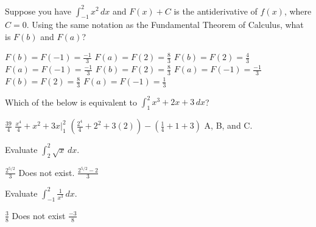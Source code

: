 \documentclass[addpoints, 12pt]{exam}%
\newcommand{\spc}{\vspace*{0.5cm}}
\begin{document}
\begin{questions}
\spc

\question[1]

Suppose you have $\int_{-1}^{2} x^2 \,dx$ and $F(x) + C$ is the antiderivative of $f(x)$, where $C = 0$.
Using the same notation as the Fundamental Theorem of Calculus, what is $F(b)$ and $F(a)$?

\begin{multicols}{2}
\begin{choices}
\choice $F(b) = F(-1) = \frac{-1}{3}$
\newline
$F(a) = F(2) = \frac{8}{3}$
\choice $F(b) = F(2) = \frac{4}{3}$
\newline 
$F(a) = F(-1) = \frac{-1}{3}$
\CorrectChoice $F(b) = F(2) = \frac{8}{3}$ 
\newline
$F(a) = F(-1) = \frac{-1}{3}$
\choice $F(b) = F(2) = \frac{8}{3}$
\newline
$F(a) = F(-1) = \frac{1}{3}$
\end{choices}
\end{multicols}

\spc

\question[1]

Which of the below is equivalent to $\int_{1}^{2} x^3 + 2x + 3 \,dx$?

\begin{multicols}{2}
\begin{choices}
\choice $\frac{39}{4}$
\choice $\frac{x^4}{4} + x^2 + 3x \Big|_1^2$
\choice $(\frac{2^4}{4} + 2^2 + 3(2)) - (\frac{1}{4} + 1 + 3)$
\CorrectChoice A, B, and C.
\end{choices}
\end{multicols}

\spc

\question[1]

Evaluate $\int_{2}^{2} \sqrt{x} \,dx$.

\begin{multicols}{2}
\begin{choices}
\choice $\frac{2^{5/2}}{3}$
\choice Does not exist.
\choice $\frac{2^{5/2}-2}{3}$
\end{choices}
\end{multicols}

\spc

\question[1]

Evaluate $\int_{-1}^{2} \frac{1}{x^3} \,dx$.

\begin{multicols}{2}
\begin{choices}
\choice $\frac{3}{8}$
\CorrectChoice Does not exist
\choice $\frac{-3}{8}$
\end{choices}
\end{multicols}

\end{questions}
\end{document}
